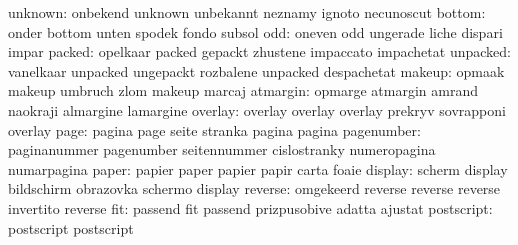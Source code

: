                   unknown: onbekend                  unknown
                           unbekannt                 neznamy
                           ignoto                    necunoscut
                   bottom: onder                     bottom
                           unten                     spodek
                           fondo                     subsol
                      odd: oneven                    odd
                           ungerade                  liche
                           dispari                   impar
                   packed: opelkaar                  packed
                           gepackt                   zhustene
                           impaccato                 impachetat
                 unpacked: vanelkaar                 unpacked
                           ungepackt                 rozbalene
                           unpacked                  despachetat
                   makeup: opmaak                    makeup
                           umbruch                   zlom
                           makeup                    marcaj
                 atmargin: opmarge                   atmargin
                           amrand                    naokraji
                           almargine                 lamargine
                  overlay: overlay                   overlay
                           overlay                   prekryv
                           sovrapponi                overlay
                     page: pagina                    page
                           seite                     stranka
                           pagina                    pagina
               pagenumber: paginanummer              pagenumber
                           seitennummer              cislostranky
                           numeropagina              numarpagina
                    paper: papier                    paper
                           papier                    papir
                           carta                     foaie
                  display: scherm                    display
                           bildschirm                obrazovka
                           schermo                   display %
                  reverse: omgekeerd                 reverse
                           reverse                   reverse
                           invertito                 reverse %
                      fit: passend                   fit
                           passend                   prizpusobive
                           adatta                    ajustat
               postscript: postscript                postscript

